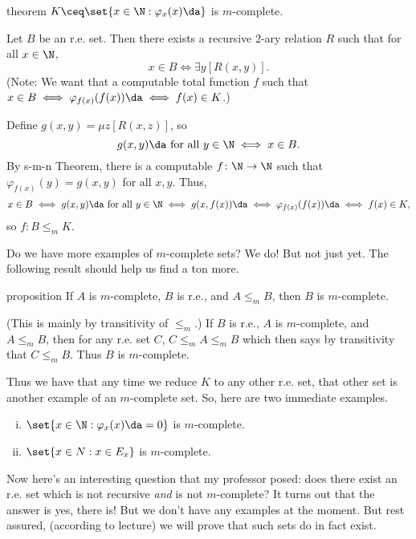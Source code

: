 \documentclass[class=article, crop=false]{standalone}
\begin{document}
\begin{result}{theorem}
  $K \ceq \set{x \in \N : \varphi_x(x) \da}$ is $m$-complete.
\end{result}
\begin{pf}
  Let $B$ be an r.e. set. Then there exists a recursive $2$-ary relation $R$ such that for all $x \in \N$,
    \[
      x \in B \iff \exists y [R(x,y)].
    \]
  (Note: We want that a computable total function $f$ such that $x \in B \iff \varphi_{f(x)}(f(x))\da \iff f(x) \in K$.)

  Define $g(x,y) = \mu z [R(x,z)]$, so
    \[
      g(x,y) \da \text{ for all } y \in \N \iff x \in B.
    \]
  By s-m-n Theorem, there is a computable $f\colon \N \to \N$ such that $\varphi_{f(x)}(y) = g(x,y)$ for all $x,y$. Thus,
    \[
      x \in B \iff g(x,y) \da \text{ for all } y \in \N \iff g(x,f(x)) \da \iff \varphi_{f(x)}(f(x)) \da \iff f(x) \in K,
    \]
  so $f\colon B \leq_m K$.
\end{pf}

Do we have more examples of $m$-complete sets? We do! But not just yet. The following result should help us find a ton more.
\begin{result}{proposition}
  If $A$ is $m$-complete, $B$ is r.e., and $A \leq_m B$, then $B$ is $m$-complete.
\end{result}
\begin{pf}
  (This is mainly by transitivity of $\leq_m$.) If $B$ is r.e., $A$ is $m$-complete, and $A \leq_m B$, then for any r.e. set $C$, $C \leq_m A \leq_m B$ which then says by transitivity that $C \leq_m B$. Thus $B$ is $m$-complete.
\end{pf}

Thus we have that any time we reduce $K$ to any other r.e. set, that other set is another example of an $m$-complete set. So, here are two immediate examples.
\begin{ex}
  \begin{enumerate}[(i)]
    \item $\set{x \in \N : \varphi_x(x) \da = 0}$ is $m$-complete.
    \item $\set{x \in N : x \in E_x}$ is $m$-complete.
  \end{enumerate}
\end{ex}

Now here's an interesting question that my professor posed: does there exist an r.e. set which is not recursive \emph{and} is not $m$-complete? It turns out that the answer is yes, there is! But we don't have any examples at the moment. But rest assured, (according to lecture) we will prove that such sets do in fact exist.
\end{document}
